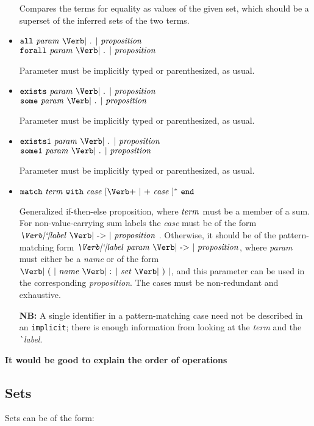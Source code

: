 \documentclass[12pt]{article}
\newcommand{\keywd}[1]{\mbox{\texttt{#1}}\xspace}
\newcommand{\ALL}{\keywd{all}}
\newcommand{\END}{\keywd{end}}
\newcommand{\EXISTS}{\keywd{exists}}
\newcommand{\EXISTSONE}{\keywd{exists1}}
\newcommand{\FORALL}{\keywd{forall}}
\newcommand{\IMPLICIT}{\keywd{implicit}}
\newcommand{\MATCH}{\keywd{match}}
\newcommand{\SOME}{\keywd{some}}
\newcommand{\SOMEONE}{\keywd{some1}}
\newcommand{\WITH}{\keywd{with}}
\newcommand{\metav}[1]{\mbox{\textit{#1}}\xspace}
\newcommand{\Case}{\metav{case}}
\newcommand{\Ident}{\metav{name}}
\newcommand{\Identifier}{\Ident}
\newcommand{\Label}{\metav{\Verb|`|label}}
\newcommand{\Setexp}{\metav{set}}
\newcommand{\Proposition}{\metav{proposition}}
\newcommand{\Param}{\metav{param}}
\newcommand{\Term}{\metav{term}}
\newcommand{\ARROW}{\mbox{\Verb| -> |}}
\newcommand{\BAR}{\mbox{\Verb+ | +}}
\newcommand{\COLON}{\mbox{\Verb| : |}}
\newcommand{\LPAREN}{\mbox{\Verb| ( |}}
\newcommand{\RPAREN}{\mbox{\Verb| ) |}}
\newcommand{\PERIOD}{\mbox{\Verb| . |}}
\newcommand{\NB}{\textbf{NB: }}
\begin{document}
\begin{itemize}
   Compares the terms for equality as values of the given set, which
   should be a superset of the inferred sets of the two terms.

\item $\ALL\ \Param\ \PERIOD\ \Proposition$\\
      $\FORALL\ \Param\ \PERIOD\ \Proposition$

   Parameter must be implicitly typed or parenthesized, as usual.

\item $\EXISTS\ \Param\ \PERIOD\ \Proposition$\\
      $\SOME\ \Param\ \PERIOD\ \Proposition$

   Parameter must be implicitly typed or parenthesized, as usual.

\item $\EXISTSONE\ \Param\ \PERIOD\ \Proposition$\\
      $\SOMEONE\ \Param\ \PERIOD\ \Proposition$

   Parameter must be implicitly typed or parenthesized, as usual.

\item $\MATCH\ \Term\ \WITH\ \Case\ [\BAR\ \Case\ ]^*\ \END$
  
  Generalized if-then-else proposition, where
  $\Term$ must be a member of a sum.  For non-value-carrying
  sum labels the \Case must be of the form  $\Label\ \ARROW\
  \Proposition$ .  Otherwise, it should be of the pattern-matching
  form $\Label\ \Param\ \ARROW\ \Proposition$, where \Param must
  either be a \Ident or of the form $\LPAREN\ \Identifier\ \COLON\ 
  \Setexp\ \RPAREN$, and this parameter can be used in the
  corresponding \Proposition.  The cases must be non-redundant
  and exhaustive.
  
  \NB A single identifier in a pattern-matching case need not
  be described in an \IMPLICIT; there is enough information from
  looking at the \Term and the \Label.
\end{itemize}

\textbf{It would be good to explain the order of operations}

\subsection{Sets}

Sets can be of the form:
\end{document}
